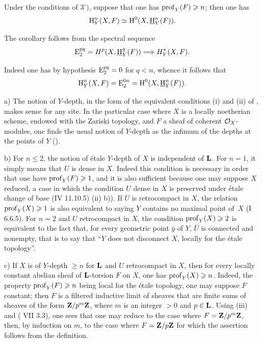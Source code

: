 \begin{corollary} \label{XIV.1.5} Under the conditions of  $3^\circ)$, suppose that one has $\operatorname{prof}_Y(F)\geqslant n$; then one has
$$
\operatorname{H}_Y^n(X, F)\simeq \operatorname{H}^0(X, {\operatorname{\underline{H}}}_Y^n(F)).
$$
\end{corollary}

The corollary follows from the spectral sequence
$$
\E_2^{pq}=H^p(X, {\h}_Y^q(F))\To H_Y^*(X, F).
$$

Indeed one has by hypothesis $\operatorname{E}_2^{pq}=0$ for $q<n$, whence it follows that
$$
\operatorname{H}_Y^n(X, F)=\operatorname{E}_2^{0n}=\operatorname{H}^0(X, {\operatorname{\underline{H}}}_Y^n(F)).
$$

\begin{remarks} \label{XIV.1.6}
a) The notion of $Y$-depth, in the form of the equivalent conditions \textup{(i)} and \textup{(ii)} of , makes sense for any site. In the particular case where $X$ is a locally noetherian scheme, endowed with the Zariski topology, and $F$ a sheaf of coherent $\mathcal{O}_X$-modules, one finds the usual notion of $Y$-depth as the infimum of the depths at the points of $Y$ ().

b) For $n\leq 2$, the notion of \'etale $Y$-depth of $X$ is independent of $\mathbf{L}$. For $n=1$, it simply means that $U$ is dense in $X$. Indeed this condition is necessary in order that one have $\operatorname{prof}_Y(F)\geqslant 1$, and it is also sufficient because one may suppose $X$ reduced, a case in which the condition $U$ dense in $X$ is preserved under \'etale change of base \textup{(\EGA IV 11.10.5) \textup{(ii)} b))}. If $U$ is retrocompact in $X$, the relation $\operatorname{prof}_Y(X)\geqslant 1$ is also equivalent to saying $Y$ contains no maximal point of~$X$ (\EGA I 6.6.5). For $n=2$ and $U$ retrocompact in $X$, the condition $\operatorname{prof}_Y(X)\geqslant 2$ is equivalent to the fact that, for every geometric point $\bar y$ of $Y$, $\bar U$ is connected and nonempty, that is to say that ``$Y$ does not disconnect $X$, locally for the \'etale topology''.

c) If $X$ is of $Y$-depth $\geq n$ for $\mathbf{L}$ and $U$ retrocompact in $X$, then for every locally constant abelian sheaf of $\mathbf{L}$-torsion $F$ on $X$, one has $\operatorname{prof}_Y(X)\geqslant n$. Indeed, the property $\operatorname{prof}_Y(F)\geqslant n$ being local for the \'etale topology, one may suppose $F$ constant; then $F$ is a filtered inductive limit of sheaves that are finite sums of sheaves of the form $\mathbf{Z}/p^m\mathbf{Z}$, where $m$ is an integer $>0$ and $p\in \mathbf{L}$. Using  \textup{(iii)} and \textup{( VII 3.3)}, one sees that one may reduce to the case where $F=\mathbf{Z}/p^m\mathbf{Z}$, then, by induction on $m$, to the case where $F=\mathbf{Z}/p\mathbf{Z}$ for which the assertion follows from the definition.


\end{remarks}
